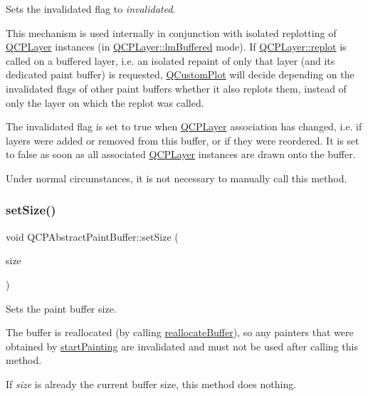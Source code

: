 Sets the invalidated flag to {\itshape invalidated}.

This mechanism is used internally in conjunction with isolated replotting of \hyperlink{classQCPLayer}{Q\+C\+P\+Layer} instances (in \hyperlink{classQCPLayer_a67dcfc1590be2a1f2227c5a39bb59c7cab581b9fab3007c4c65f057f4185d7538}{Q\+C\+P\+Layer\+::lm\+Buffered} mode). If \hyperlink{classQCPLayer_adefd53b6db02f470151c416f42e37180}{Q\+C\+P\+Layer\+::replot} is called on a buffered layer, i.\+e. an isolated repaint of only that layer (and its dedicated paint buffer) is requested, \hyperlink{classQCustomPlot}{Q\+Custom\+Plot} will decide depending on the invalidated flags of other paint buffers whether it also replots them, instead of only the layer on which the replot was called.

The invalidated flag is set to true when \hyperlink{classQCPLayer}{Q\+C\+P\+Layer} association has changed, i.\+e. if layers were added or removed from this buffer, or if they were reordered. It is set to false as soon as all associated \hyperlink{classQCPLayer}{Q\+C\+P\+Layer} instances are drawn onto the buffer.

Under normal circumstances, it is not necessary to manually call this method. \mbox{\label{classQCPAbstractPaintBuffer_a8b68c3cd36533f1a4a23b5ce8cd66f01}} 
\subsubsection{\texorpdfstring{set\+Size()}{setSize()}}
{\footnotesize\ttfamily void Q\+C\+P\+Abstract\+Paint\+Buffer\+::set\+Size (\begin{DoxyParamCaption}\item[{const Q\+Size \&}]{size }\end{DoxyParamCaption})}

Sets the paint buffer size.

The buffer is reallocated (by calling \hyperlink{classQCPAbstractPaintBuffer_aee7506a52bd7e5a07c2af27935eb13e7}{reallocate\+Buffer}), so any painters that were obtained by \hyperlink{classQCPAbstractPaintBuffer_a9e9f29b19c033cf02fb96f1a148463f3}{start\+Painting} are invalidated and must not be used after calling this method.

If {\itshape size} is already the current buffer size, this method does nothing. \mbox{\label{classQCPAbstractPaintBuffer_a9e9f29b19c033cf02fb96f1a148463f3}} 
